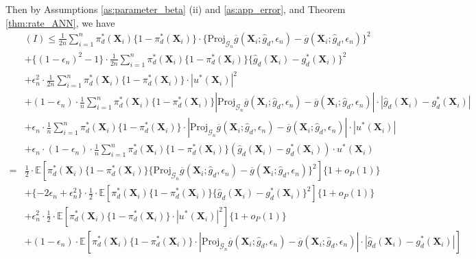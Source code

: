\documentclass[11pt]{article}
\numberwithin{equation}{section}
\begin{document}
Then by Assumptions \ref{as:parameter_beta} (ii) and \ref{as:app_error}, and Theorem \ref{thm:rate_ANN}, we have
\begin{align*}
	&(I)\leq\frac{1}{2n}\sum_{i=1}^n \pi_d^*(\boldsymbol{X}_i)\{1-\pi_d^*(\boldsymbol{X}_i)\}\cdot \{\text{Proj}_{\mathcal{G}_n}\overline{g}(\boldsymbol{X}_{i};\widehat{g}_d,\epsilon_n)-\overline{g}(\boldsymbol{X}_{i};\widehat{g}_d,\epsilon_n)\}^2\\
	&+\{(1-\epsilon_n)^2-1\}\cdot \frac{1}{2n}\sum_{i=1}^n \pi_d^*(\boldsymbol{X}_i)\{1-\pi_d^*(\boldsymbol{X}_i)\}\{\widehat{g}_d(\boldsymbol{X}_{i})-g^*_d(\boldsymbol{X}_{i})\}^2\\
	&+\epsilon^2_n\cdot \frac{1}{2n}\sum_{i=1}^n \pi_d^*(\boldsymbol{X}_i)\{1-\pi_d^*(\boldsymbol{X}_i)\}\cdot|u^*(\boldsymbol{X}_{i})|^2\\
	&+(1-\epsilon_n)\cdot \frac{1}{n}\sum_{i=1}^n \pi_d^*(\boldsymbol{X}_i)\{1-\pi_d^*(\boldsymbol{X}_i)\}|\text{Proj}_{\mathcal{G}_n}\overline{g}(\boldsymbol{X}_{i};\widehat{g}_d,\epsilon_n)-\overline{g}(\boldsymbol{X}_{i};\widehat{g}_d,\epsilon_n)| \cdot |\widehat{g}_d(\boldsymbol{X}_{i})-g^*_d(\boldsymbol{X}_{i})| \\
	&+\epsilon_n \cdot \frac{1}{n}\sum_{i=1}^n \pi_d^*(\boldsymbol{X}_i)\{1-\pi_d^*(\boldsymbol{X}_i)\}\cdot|\text{Proj}_{\mathcal{G}_n}\overline{g}(\boldsymbol{X}_{i};\widehat{g}_d,\epsilon_n)-\overline{g}(\boldsymbol{X}_{i};\widehat{g}_d,\epsilon_n)|\cdot |u^*(\boldsymbol{X}_{i})| \\
	&+ \epsilon_n \cdot (1-\epsilon_n)\cdot  \frac{1}{n}\sum_{i=1}^n \pi_d^*(\boldsymbol{X}_i)\{1-\pi_d^*(\boldsymbol{X}_i)\}(\widehat{g}_d(\boldsymbol{X}_{i})-g^*_d(\boldsymbol{X}_{i})) \cdot u^*(\boldsymbol{X}_{i})\\
	= & \frac{1}{2}\cdot \mathbb{E} \left[\pi_d^*(\boldsymbol{X}_i)\{1-\pi_d^*(\boldsymbol{X}_i)\}\{\text{Proj}_{\mathcal{G}_n}\overline{g}(\boldsymbol{X}_{i};\widehat{g}_d,\epsilon_n)-\overline{g}(\boldsymbol{X}_{i};\widehat{g}_d,\epsilon_n)\}^2\right]\{1+o_P(1)\}\\
	&+\{-2\epsilon_n+\epsilon_n^2\}\cdot \frac{1}{2}\cdot \mathbb{E} \left[\pi_d^*(\boldsymbol{X}_i)\{1-\pi_d^*(\boldsymbol{X}_i)\}\{\widehat{g}_d(\boldsymbol{X}_{i})-g^*_d(\boldsymbol{X}_{i})\}^2\right]\{1+o_P(1)\}\\
	&+\epsilon^2_n\cdot \frac{1}{2}\cdot \mathbb{E} \left[\pi_d^*(\boldsymbol{X}_i)\{1-\pi_d^*(\boldsymbol{X}_i)\}\cdot|u^*(\boldsymbol{X}_{i})|^2\right]\{1+o_P(1)\}\\
	&+(1-\epsilon_n)\cdot \mathbb{E} \left[ \pi_d^*(\boldsymbol{X}_i)\{1-\pi_d^*(\boldsymbol{X}_i)\}\cdot|\text{Proj}_{\mathcal{G}_n}\overline{g}(\boldsymbol{X}_{i};\widehat{g}_d,\epsilon_n)-\overline{g}(\boldsymbol{X}_{i};\widehat{g}_d,\epsilon_n)| \cdot |\widehat{g}_d(\boldsymbol{X}_{i})-g^*_d(\boldsymbol{X}_{i})| \right]\\

\end{align*}
\end{document}
